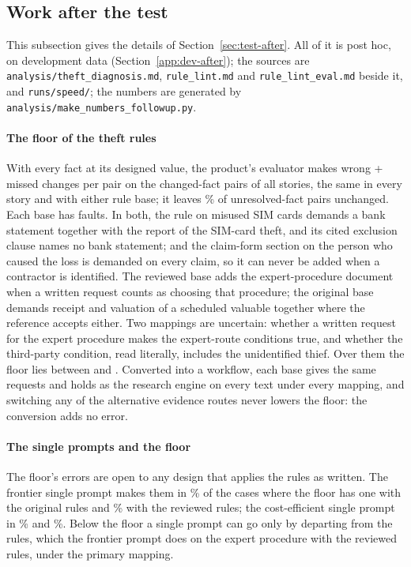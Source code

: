 \subsection{Work after the test}
\label{app:rob-after}
This subsection gives the details of Section~\ref{sec:test-after}. All of it is post hoc, on development data (Section~\ref{app:dev-after}); the sources are \texttt{analysis/\allowbreak{}theft\_\allowbreak{}diagnosis.md}, \texttt{rule\_\allowbreak{}lint.md} and \texttt{rule\_\allowbreak{}lint\_\allowbreak{}eval.md} beside it, and \texttt{runs/\allowbreak{}speed/}; the numbers are generated by \texttt{analysis/\allowbreak{}make\_\allowbreak{}numbers\_\allowbreak{}follow\allowbreak{}up.py}.

\paragraph{The floor of the theft rules}
With every fact at its designed value, the product's evaluator makes \fuFloor{} wrong + missed changes per pair on the \fuFloorPairs{} changed-fact pairs of all \fuFloorStories{} stories, the same in every story and with either rule base; it leaves \fuFloorUnresUnchanged\% of unresolved-fact pairs unchanged. Each base has \fuFloorFaults{} faults. In both, the rule on misused SIM cards demands a bank statement together with the report of the SIM-card theft, and its cited exclusion clause names no bank statement; and the claim-form section on the person who caused the loss is demanded on every claim, so it can never be added when a contractor is identified. The reviewed base adds the expert-procedure document when a written request counts as choosing that procedure; the original base demands receipt and valuation of a scheduled valuable together where the reference accepts either. Two mappings are uncertain: whether a written request for the expert procedure makes the expert-route conditions true, and whether the third-party condition, read literally, includes the unidentified thief. Over them the floor lies between \fuFloorLo{} and \fuFloorHi. Converted into a workflow, each base gives the same requests and holds as the research engine on every text under every mapping, and switching any of the \fuConvAlternatives{} alternative evidence routes never lowers the floor: the conversion adds no error.

\paragraph{The single prompts and the floor}
The floor's errors are open to any design that applies the rules as written. The frontier single prompt makes them in \fuFloorSingleOrigShare\% of the cases where the floor has one with the original rules and \fuFloorSingleRevShare\% with the reviewed rules; the cost-efficient single prompt in \fuFloorSingleLunaOrigShare\% and \fuFloorSingleLunaRevShare\%. Below the floor a single prompt can go only by departing from the rules, which the frontier prompt does on the expert procedure with the reviewed rules, under the primary mapping.

